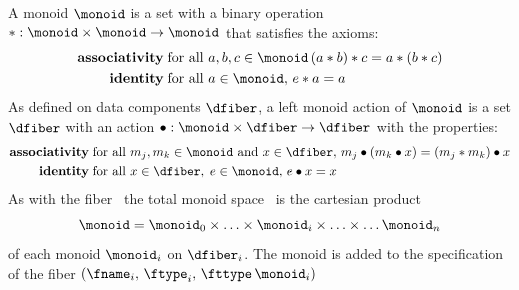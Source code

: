 \documentclass[../main.tex]{subfiles}
\begin{document}
A monoid \cite{Monoid2021} $\monoid$ is a set with a binary operation $\ast:\monoid \times \monoid\rightarrow \monoid$ that satisfies the axioms:
\begin{align}
    \textbf{associativity}\; & \text{for all } a, b, c \in \monoid \, (a \ast b) \ast c = a \ast (b \ast c)\\
    \textbf{identity}\; & \text{for all } a\in \monoid,\,  e\ast a = a 
\end{align} 
As defined on data components $\dfiber$, a left monoid action \cite{SemigroupAction2021,nlabauthorsAction2021} of $\monoid$ is a set $\dfiber$ with an action $\bullet: \monoid\times \dfiber \rightarrow \dfiber$ with the properties:
\begin{align}
    \textbf{associativity}\;& \text{for all } m_j, m_k \in \monoid \text{ and } x\in \dfiber,\, m_j\bullet(m_k\bullet x) = (m_j\ast m_k) \bullet x\label{eq:math:data:monoid:asso}\\
    \textbf{identity}\;& \text{for all } x\in \dfiber,\; e\in \monoid,\,  e\bullet x = x \label{eq:math:data:monoid:identity}
\end{align}
As with the fiber \dfiber\, the total monoid space \monoid\ is the cartesian product
\begin{equation}
    \label{eq:math:data:monoid:decompose}
\monoid= \monoid_{0} \times \ldots \times \monoid_{i}\times \ldots \times\ldots \monoid_{n}
\end{equation}
of each monoid \(\monoid_{i}\) on \(\dfiber_{i}\).  The monoid is added to the specification of the fiber \((\fname_i,\, \ftype_i,\, \fttype\, \monoid_i)\)
\end{document}
